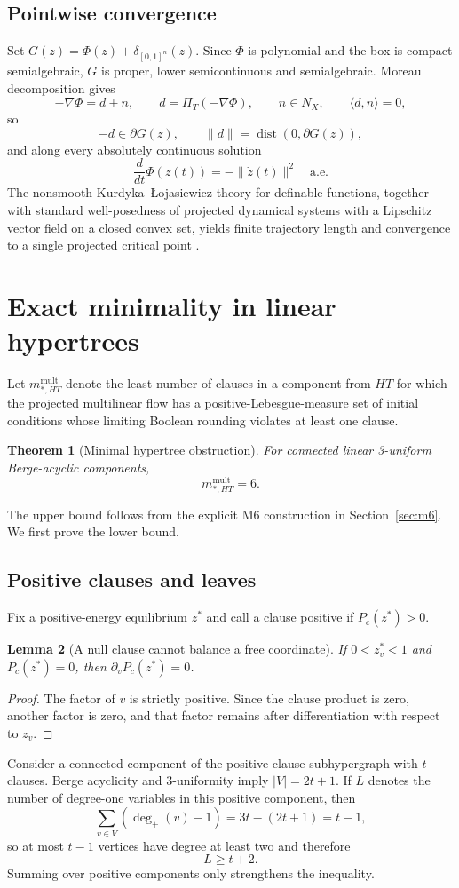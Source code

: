 \documentclass[11pt,a4paper]{article}
\newtheorem{theorem}{Theorem}[section]
\newtheorem{lemma}[theorem]{Lemma}
\begin{document}
\subsection{Pointwise convergence}
Set $G(z)=\Phi(z)+\delta_{[0,1]^n}(z)$. Since $\Phi$ is polynomial and the box is compact semialgebraic, $G$ is proper, lower semicontinuous and semialgebraic. Moreau decomposition gives
\[
-\nabla\Phi=d+n,\qquad d=\Pi_T(-\nabla\Phi),\qquad n\in N_X,\qquad \langle d,n\rangle=0,
\]
so
\[
-d\in\partial G(z),\qquad \|d\|=\operatorname{dist}(0,\partial G(z)),
\]
and along every absolutely continuous solution
\begin{equation}
\frac{d}{dt}\Phi(z(t))=-\|\dot z(t)\|^2\quad\text{a.e.}
\end{equation}
The nonsmooth Kurdyka--\L{}ojasiewicz theory for definable functions, together with standard well-posedness of projected dynamical systems with a Lipschitz vector field on a closed convex set, yields finite trajectory length and convergence to a single projected critical point \cite{bolte2007lojasiewicz,bolte2007clarke,brogliato2006equivalence,nagurney1996projected}.
\section{Exact minimality in linear hypertrees}
Let $m_{*,HT}^{\mathrm{mult}}$ denote the least number of clauses in a component from $HT$ for which the projected multilinear flow has a positive-Lebesgue-measure set of initial conditions whose limiting Boolean rounding violates at least one clause.
\begin{theorem}[Minimal hypertree obstruction]
For connected linear 3-uniform Berge-acyclic components,
\[
m_{*,HT}^{\mathrm{mult}}=6.
\]
\end{theorem}
The upper bound follows from the explicit M6 construction in Section~\ref{sec:m6}. We first prove the lower bound.
\subsection{Positive clauses and leaves}
Fix a positive-energy equilibrium $z^*$ and call a clause positive if $P_c(z^*)>0$.
\begin{lemma}[A null clause cannot balance a free coordinate]
If $0<z_v^*<1$ and $P_c(z^*)=0$, then $\partial_vP_c(z^*)=0$.
\end{lemma}
\begin{proof}
The factor of $v$ is strictly positive. Since the clause product is zero, another factor is zero, and that factor remains after differentiation with respect to $z_v$.
\end{proof}
Consider a connected component of the positive-clause subhypergraph with $t$ clauses. Berge acyclicity and 3-uniformity imply $|V|=2t+1$. If $L$ denotes the number of degree-one variables in this positive component, then
\[
\sum_{v\in V}(\deg_+(v)-1)=3t-(2t+1)=t-1,
\]
so at most $t-1$ vertices have degree at least two and therefore
\begin{equation}L\ge t+2.\end{equation}
Summing over positive components only strengthens the inequality.
\end{document}
